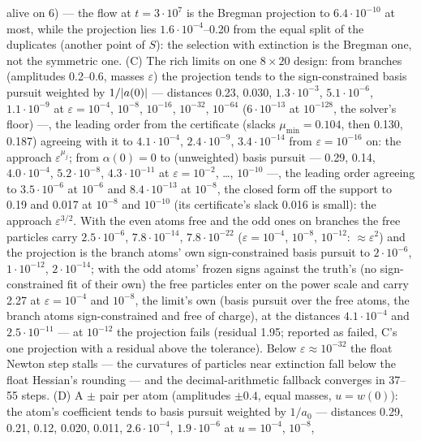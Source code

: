 \begin{sloppypar}
alive on 6) --- the flow at $t = 3\cdot10^7$ is the Bregman projection to $6.4\cdot10^{-10}$ at most, while the
projection lies $1.6\cdot10^{-4}$--0.20 from the equal split of the duplicates (another point of $S$): the selection
with extinction is the Bregman one, not the symmetric one. (C) The rich limits on one $8\times20$ design: from branches
(amplitudes 0.2--0.6, masses $\varepsilon$) the projection tends to the sign-constrained basis pursuit weighted by
$1/\lvert a(0)\rvert$ --- distances 0.23, 0.030, $1.3\cdot10^{-3}$, $5.1\cdot10^{-6}$, $1.1\cdot10^{-9}$ at
$\varepsilon = 10^{-4}$, $10^{-8}$, $10^{-16}$, $10^{-32}$, $10^{-64}$ ($6\cdot10^{-13}$ at $10^{-128}$, the solver's
floor) ---, the leading order from the certificate (slacks $\mu_{\min} = 0.104$, then 0.130, 0.187) agreeing with it to
$4.1\cdot10^{-4}$, $2.4\cdot10^{-9}$, $3.4\cdot10^{-14}$ from $\varepsilon = 10^{-16}$ on: the approach
$\varepsilon^{\mu_j}$; from $\alpha(0) = 0$ to (unweighted) basis pursuit --- 0.29, 0.14, $4.0\cdot10^{-4}$,
$5.2\cdot10^{-8}$, $4.3\cdot10^{-11}$ at $\varepsilon = 10^{-2}$, \dots, $10^{-10}$ ---, the leading order agreeing to
$3.5\cdot10^{-6}$ at $10^{-6}$ and $8.4\cdot10^{-13}$ at $10^{-8}$, the closed form off the support to 0.19 and 0.017 at
$10^{-8}$ and $10^{-10}$ (its certificate's slack 0.016 is small): the approach $\varepsilon^{3/2}$. With the even atoms
free and the odd ones on branches the free particles carry $2.5\cdot10^{-6}$, $7.8\cdot10^{-14}$, $7.8\cdot10^{-22}$
($\varepsilon = 10^{-4}$, $10^{-8}$, $10^{-12}$: $\approx\varepsilon^2$) and the projection is the branch atoms' own
sign-constrained basis pursuit to $2\cdot10^{-6}$, $1\cdot10^{-12}$, $2\cdot10^{-14}$; with the odd atoms' frozen signs
against the truth's (no sign-constrained fit of their own) the free particles enter on the power scale and carry 2.27 at
$\varepsilon = 10^{-4}$ and $10^{-8}$, the limit's own (basis pursuit over the free atoms, the branch atoms
sign-constrained and free of charge), at the distances $4.1\cdot10^{-4}$ and $2.5\cdot10^{-11}$ --- at $10^{-12}$ the
projection fails (residual 1.95; reported as failed, C's one projection with a residual above the tolerance). Below
$\varepsilon\approx10^{-32}$ the float Newton step stalls --- the curvatures of particles near extinction fall below the
float Hessian's rounding --- and the decimal-arithmetic fallback converges in 37--55 steps. (D) A $\pm$ pair per atom
(amplitudes $\pm0.4$, equal masses, $u = w(0)$): the atom's coefficient tends to basis pursuit weighted by $1/a_0$ ---
distances 0.29, 0.21, 0.12, 0.020, 0.011, $2.6\cdot10^{-4}$, $1.9\cdot10^{-6}$ at $u = 10^{-4}$, $10^{-8}$,

\end{sloppypar}
